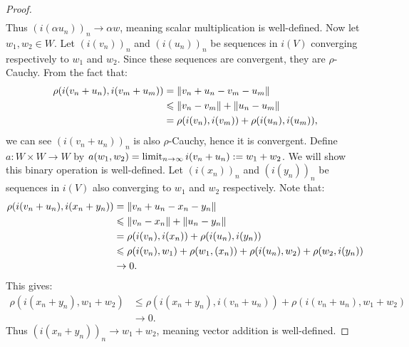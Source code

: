 \begin{proof}
\begin{equation*}
\begin{split}
                \end{split}
                \end{equation*}
            Thus $(i(\alpha u_n))_n \rightarrow \alpha w$, meaning scalar multiplication is well-defined. Now let $w_1,w_2 \in W$. Let $(i(v_n))_n$ and $(i(u_n))_n$ be sequences in $i(V)$ converging respectively to $w_1$ and $w_2$. Since these sequences are convergent, they are $\rho$-Cauchy. From the fact that:
                \begin{equation*}
                \begin{split}
                    \rho(i(v_n + u_n), i(v_m + u_m))
                    & = \left\lVert v_n + u_n - v_m - u_m \right\rVert \\
                    & \leqslant \left\lVert v_n - v_m \right\rVert + \left\lVert u_n - u_m \right\rVert \\
                    & = \rho(i(v_n),i(v_m)) + \rho(i(u_n),i(u_m)),
                \end{split}
                \end{equation*}
            we can see $(i(v_n + u_n))_n$ is also $\rho$-Cauchy, hence it is convergent. Define $a: W \times W \rightarrow W$ by $a(w_1,w_2) = \operatorname*{limit}_{n \rightarrow \infty} i(v_n + u_n) := w_1 + w_2$. We will show this binary operation is well-defined. Let $(i(x_n))_n$ and $(i(y_n))_n$ be sequences in $i(V)$ also converging to $w_1$ and $w_2$ respectively. Note that:
                \begin{equation*}
                \begin{split}
                    \rho(i(v_n + u_n), i(x_n + y_n))
                    & = \left\lVert v_n + u_n - x_n - y_n \right\rVert \\
                    & \leqslant \left\lVert v_n - x_n \right\rVert + \left\lVert u_n - y_n \right\rVert \\
                    & = \rho(i(v_n),i(x_n)) + \rho(i(u_n),i(y_n)) \\
                    & \leqslant \rho(i(v_n),w_1) + \rho(w_1,(x_n)) + \rho(i(u_n),w_2) + \rho(w_2,i(y_n)) \\
                    & \rightarrow 0.
                \end{split}
                \end{equation*}
            This gives:
                \begin{equation*}
                \begin{split}
                    \rho(i(x_n + y_n), w_1 + w_2)
                    & \leq \rho(i(x_n + y_n), i(v_n+u_n)) + \rho(i(v_n + u_n),w_1 + w_2) \\
                    & \rightarrow 0.
                \end{split}
                \end{equation*}
            Thus $(i(x_n + y_n))_n \rightarrow w_1 + w_2$, meaning vector addition is well-defined.


\end{proof}

